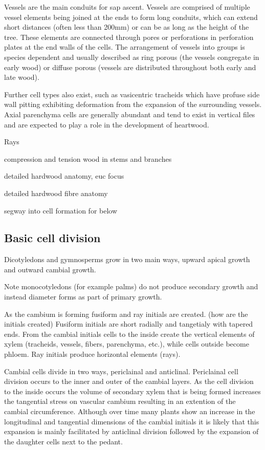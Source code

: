 \documentclass{article}
\begin{document}
Vessels are the main conduits for sap ascent. Vessels are comprised of multiple
vessel elements being joined at the ends to form long conduits, which can extend short
distances (often less than 200mm) or can be as long as the height of the tree.
These elements are connected through pores or perforations in perforation
plates at the end walls of the cells. The arrangement of vessels into groups is
species dependent and usually described as ring porous (the vessels congregate in early wood)
or diffuse porous (vessels are distributed throughout both early and late wood).

Further cell types also exist, such as vasicentric tracheids which have profuse
side wall pitting exhibiting deformation from the expansion of the surrounding
vessels. Axial parenchyma cells are generally abundant and tend to exist in
vertical files and are expected to play a role in the development of heartwood.

Rays

compression and tension wood in stems and branches

detailed hardwood anatomy, euc focus

detailed hardwood fibre anatomy

segway into cell formation for below

\subsection{Basic cell division}
Dicotyledons and gymnosperms grow in two main ways, upward apical growth and
outward cambial growth.

Note monocotyledons (for example palms) do not produce secondary growth and instead diameter
forms as part of primary growth.

As the cambium is forming fusiform and ray initials are created.
(how are the initials created)
Fusiform initials are short radially and tangetialy with tapered
ends. From the cambial initials cells to the inside create the vertical elements
of xylem (tracheids, vessels, fibers, parenchyma, etc.), while cells outside become phloem.
Ray initials produce horizontal elements (rays).

Cambial cells divide in two ways, periclainal and anticlinal.
Periclainal cell division occurs to the inner and outer of the cambial layers.
As the cell division to the inside occurs the volume of secondary xylem that is being
formed increases the tangential stress on vascular cambium resulting in an
extention of the cambial circumference. Although over time many plants show an
increase in the longitudinal and tangential dimensions of the cambial initials it is
likely that this expansion is mainly facilitated by anticlinal division followed
by the expansion of the daughter cells next to the pedant.
\end{document}
